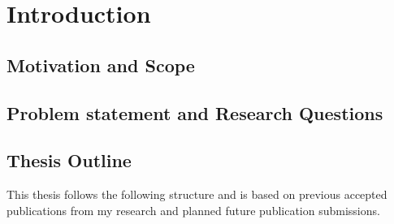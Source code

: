 
\chapter{Introduction}  %
\placeholder{}

\ifpdf
    \graphicspath{{Chapter1/Figs/Raster/}{Chapter1/Figs/PDF/}{Chapter1/Figs/}}
\else
    \graphicspath{{Chapter1/Figs/Vector/}{Chapter1/Figs/}}
\fi


\section{Motivation and Scope} %



\section{Problem statement and Research Questions}  %



\section{Thesis Outline} 

This thesis follows the following structure and is based on previous accepted publications from my research and planned future publication submissions.